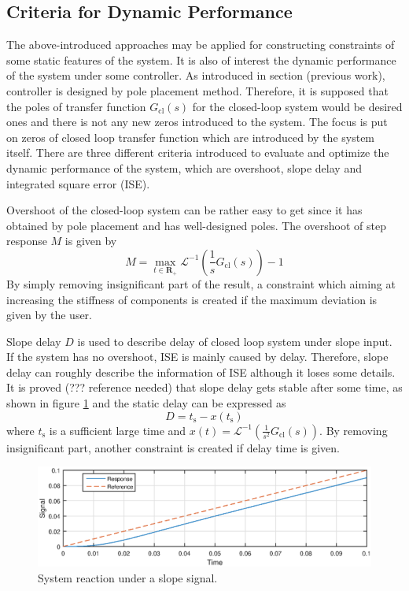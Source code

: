 \subsection{Criteria for Dynamic Performance}
The above-introduced approaches may be applied for constructing constraints of some static features of the system. It is also of interest the dynamic performance of the system under some controller. As introduced in section (previous work), controller is designed by pole placement method. Therefore, it is supposed that the poles of transfer function $G_\text{cl}(s)$ for the closed-loop system would be desired ones and there is not any new zeros introduced to the system. The focus is put on zeros of closed loop transfer function which are introduced by the system itself. There are three different criteria introduced to evaluate and optimize the dynamic performance of the system, which are overshoot, slope delay and integrated square error (ISE).

Overshoot of the closed-loop system can be rather easy to get since it has obtained by pole placement and has well-designed poles. The overshoot of step response $M$ is given by $$M=\max_{t \in \mathbf{R_{+}}}\mathcal{L}^{-1}(\frac{1}{s}G_{\text{cl}}(s))-1$$ By simply removing insignificant part of the result, a constraint which aiming at increasing the stiffness of components is created if the maximum deviation is given by the user. 

Slope delay $D$ is used to describe delay of closed loop system under slope input. If the system has no overshoot, ISE is mainly caused by delay. Therefore, slope delay can roughly describe the information of ISE although it loses some details. It is proved (??? reference needed) that slope delay gets stable after some time, as shown in figure \ref{fig:slope} and the static delay can be expressed as $$D=t_\text{s}-x(t_\text{s})$$ where $t_\text{s}$ is a sufficient large time and $x(t)=\mathcal{L}^{-1}(\frac{1}{s^2}G_{\text{cl}}(s))$. By removing insignificant part, another constraint is created if delay time is given.

\begin{figure}[ht]
  \begin{center}
    \includegraphics[width=\linewidth]{Plots/slope_delay.eps}
  \end{center}
  \caption{System reaction under a slope signal.}
  \label{fig:slope}
\end{figure}


